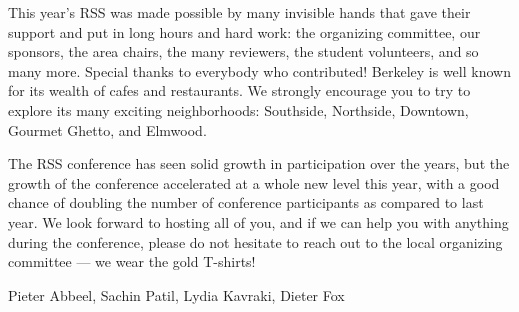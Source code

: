 This year’s RSS was made possible by many invisible hands that gave their support and put in long hours and hard work: the organizing committee, our sponsors, the area chairs, the many reviewers, the student volunteers, and so many more.  Special thanks to everybody who contributed! Berkeley is well known for its wealth of cafes and restaurants.  We strongly encourage you to try to explore its many exciting neighborhoods: Southside, Northside, Downtown, Gourmet Ghetto, and Elmwood.

\vspace{1mm}

The RSS conference has seen solid growth in participation over the years, but the growth of the conference accelerated at a whole new level this year, with a good chance of doubling the number of conference participants as compared to last year. We look forward to hosting all of you, and if we can help you with anything during the conference, please do not hesitate to reach out to the local organizing committee — we wear the gold T-shirts!  

\vspace{1cm}

Pieter Abbeel, Sachin Patil, Lydia Kavraki, Dieter Fox
%
\endgroup{}
\normalsize

